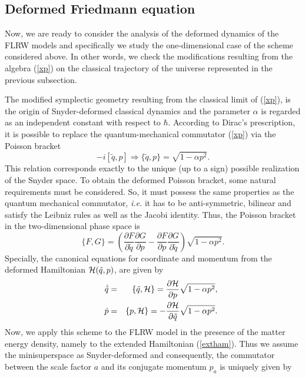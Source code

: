 \documentclass[showpacs,amsmath,nofootinbib,amssymb,epsfig]{revtex4}
\newcommand{\p}{\partial}
\begin{document}
\subsection{Deformed Friedmann equation}

 Now, we are ready to consider the analysis of the deformed dynamics of the FLRW models and specifically we study the one-dimensional case of the scheme considered above. In other words, we check the modifications resulting from the algebra (\ref{xp}) on the classical trajectory of the universe represented in the previous subsection.

The modified symplectic geometry resulting from the classical limit of (\ref{xp}), is the origin of Snyder-deformed classical dynamics and the parameter $\alpha$ is regarded as an independent constant with respect to $\hbar$. According to Dirac's prescription, it is possible to replace the quantum-mechanical commutator (\ref{xp}) via the Poisson bracket
\begin{equation}\label{pm}
-i[\tilde{q},p]\Rightarrow\{\tilde{q},p\}=\sqrt{1-\alpha p^{2}}.
\end{equation}
This relation corresponds exactly to the unique (up to a sign) possible realization of the Snyder space. To obtain the deformed Poisson bracket, some natural requirements must be considered. So, it must possess the same properties as the quantum mechanical commutator, {\it i.e.} it has to be anti-symmetric, bilinear and satisfy the Leibniz rules as well as the Jacobi identity. Thus, the Poisson bracket in the two-dimensional phase space is
\begin{equation}
\{F,G\}=\left(\frac{\p F}{\p \tilde{q}}\frac{\p G}{\p p}-\frac{\p F}{\p p}\frac{\p G}{\p \tilde{q}}\right)\sqrt{1-\alpha p^{2}}.
\end{equation}
Specially, the canonical equations for coordinate and momentum from the deformed Hamiltonian ${\cal H}(\tilde{q},p)$, are given by
\begin{eqnarray}
\dot{\tilde{q}}&=&\{\tilde{q},{\cal H}\}=\frac{\p{\cal H}}{\p p}\sqrt{1-\alpha p^{2}},\nonumber\\ \qquad \dot{p}&=&\{p,{\cal H}\}=-\frac{\p{\cal H}}{\p \tilde{q}}\sqrt{1-\alpha p^{2}}.
\end{eqnarray}
Now, we apply this scheme to the FLRW model in the presence of the matter energy density, namely to the extended Hamiltonian (\ref{extham}). Thus we assume the minisuperspace as Snyder-deformed and consequently, the commutator between the scale factor $a$ and its conjugate momentum $p_{a}$ is uniquely given by
\end{document}
